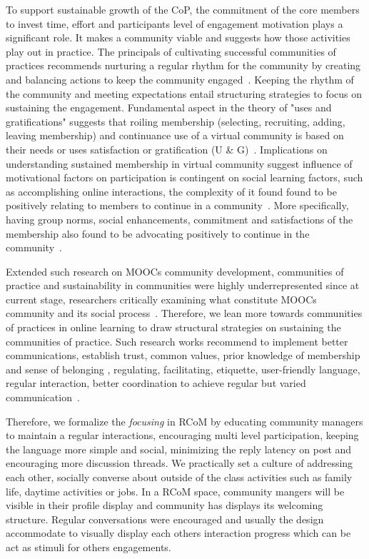 \documentclass[format=acmsmall, review=false, screen=true]{acmart}
\begin{document}
To support sustainable growth of the CoP, the commitment of the core members to invest time, effort and participants level of engagement motivation plays a significant role. It makes a community viable and suggests how those activities play out in practice. The principals of cultivating successful communities of practices recommends nurturing a regular rhythm for the community by creating and balancing actions to keep the community engaged~\cite{wenger2002seven}. Keeping the rhythm of the community and meeting expectations entail structuring strategies to focus on sustaining the engagement. Fundamental aspect in the theory of "uses and gratifications" suggests that roiling membership (selecting, recruiting, adding, leaving membership) and continuance use of a virtual community is based on their needs or uses satisfaction or gratification (U \& G)~\cite{sangwan2005virtual}. Implications on understanding sustained membership in virtual community suggest influence of motivational factors on participation is contingent on social learning factors, such as accomplishing online interactions, the complexity of it found found to be positively relating to members to continue in a community~\cite{sun2012understanding}. More specifically, having group norms, social enhancements, commitment and satisfactions of the membership also found to be advocating positively to continue in the community~\cite{cheung2009understanding}. 

Extended such research on MOOCs community development, communities of practice and sustainability in communities were highly underrepresented since at current stage, researchers critically examining what constitute MOOCs community and its social process~\cite{oleksandra2016untangling,poquet2018social}. Therefore, we lean more towards communities of practices in online learning to draw structural strategies on sustaining the communities of practice. Such research works recommend to implement better communications, establish trust, common values, prior knowledge of membership and sense of belonging , regulating, facilitating, etiquette, user-friendly language, regular interaction, better coordination to achieve regular but varied communication~\cite{bradbury2015role,gannon2007communities}. 

Therefore, we formalize the \textit{focusing} in RCoM by educating community managers to maintain a regular interactions, encouraging multi level participation, keeping the language more simple and social, minimizing the reply latency on post and encouraging more discussion threads. We practically set a culture of addressing each other, socially converse about outside of the class activities such as family life, daytime activities or jobs. In a RCoM space, community mangers will be visible in their profile display and community has displays its welcoming structure. Regular conversations were encouraged and usually the design accommodate to visually display each others interaction progress which can be act as stimuli for others  engagements.   
\end{document}
